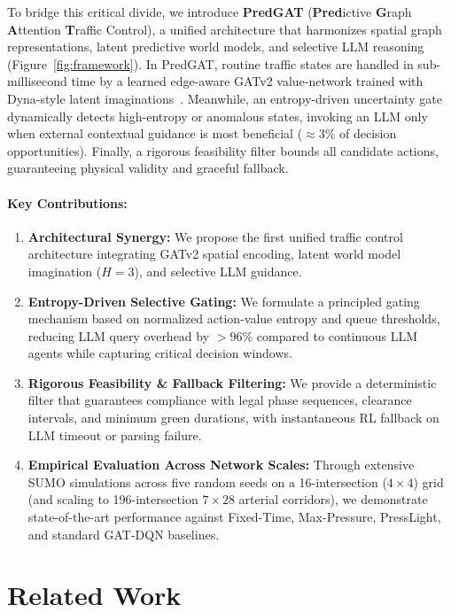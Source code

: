 \documentclass[11pt,a4paper,twocolumn]{article}
\begin{document}
To bridge this critical divide, we introduce \textbf{PredGAT} (\textbf{Pred}ictive \textbf{G}raph \textbf{A}ttention \textbf{T}raffic Control), a unified architecture that harmonizes spatial graph representations, latent predictive world models, and selective LLM reasoning (Figure~\ref{fig:framework}). In PredGAT, routine traffic states are handled in sub-millisecond time by a learned edge-aware GATv2 value-network trained with Dyna-style latent imaginations~\cite{sutton1991dyna,ha2018worldmodels}. Meanwhile, an entropy-driven uncertainty gate dynamically detects high-entropy or anomalous states, invoking an LLM only when external contextual guidance is most beneficial ($\approx 3\%$ of decision opportunities). Finally, a rigorous feasibility filter bounds all candidate actions, guaranteeing physical validity and graceful fallback.

\paragraph{Key Contributions:}
\begin{enumerate}
    \item \textbf{Architectural Synergy:} We propose the first unified traffic control architecture integrating GATv2 spatial encoding, latent world model imagination ($H=3$), and selective LLM guidance.
    \item \textbf{Entropy-Driven Selective Gating:} We formulate a principled gating mechanism based on normalized action-value entropy and queue thresholds, reducing LLM query overhead by $>96\%$ compared to continuous LLM agents while capturing critical decision windows.
    \item \textbf{Rigorous Feasibility \& Fallback Filtering:} We provide a deterministic filter that guarantees compliance with legal phase sequences, clearance intervals, and minimum green durations, with instantaneous RL fallback on LLM timeout or parsing failure.
    \item \textbf{Empirical Evaluation Across Network Scales:} Through extensive SUMO simulations across five random seeds on a 16-intersection ($4\times4$) grid (and scaling to 196-intersection $7\times28$ arterial corridors), we demonstrate state-of-the-art performance against Fixed-Time, Max-Pressure, PressLight, and standard GAT-DQN baselines.
\end{enumerate}

\section{Related Work}
\label{sec:related}
\end{document}
